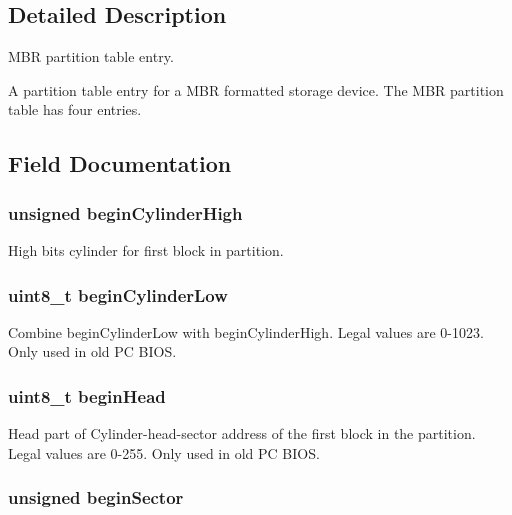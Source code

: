 \subsection{Detailed Description}
M\-B\-R partition table entry. 

A partition table entry for a M\-B\-R formatted storage device. The M\-B\-R partition table has four entries. 

\subsection{Field Documentation}
\hypertarget{structpartition_table_aae20759e6c6dbfa51368964f8fe095c7}{
\subsubsection[{begin\-Cylinder\-High}]{\setlength{\rightskip}{0pt plus 5cm}unsigned begin\-Cylinder\-High}}\label{structpartition_table_aae20759e6c6dbfa51368964f8fe095c7}
High bits cylinder for first block in partition. \hypertarget{structpartition_table_afefdee23280567f8434f9c31610e0a3b}{
\subsubsection[{begin\-Cylinder\-Low}]{\setlength{\rightskip}{0pt plus 5cm}uint8\-\_\-t begin\-Cylinder\-Low}}\label{structpartition_table_afefdee23280567f8434f9c31610e0a3b}
Combine begin\-Cylinder\-Low with begin\-Cylinder\-High. Legal values are 0-\/1023. Only used in old P\-C B\-I\-O\-S. \hypertarget{structpartition_table_ab27b713d70d01c43e31fc67e08f876bf}{
\subsubsection[{begin\-Head}]{\setlength{\rightskip}{0pt plus 5cm}uint8\-\_\-t begin\-Head}}\label{structpartition_table_ab27b713d70d01c43e31fc67e08f876bf}
Head part of Cylinder-\/head-\/sector address of the first block in the partition. Legal values are 0-\/255. Only used in old P\-C B\-I\-O\-S. \hypertarget{structpartition_table_a3ef026d5e8a9c697e414cf773b129db4}{
\subsubsection[{begin\-Sector}]{\setlength{\rightskip}{0pt plus 5cm}unsigned begin\-Sector}}\label{structpartition_table_a3ef026d5e8a9c697e414cf773b129db4}
